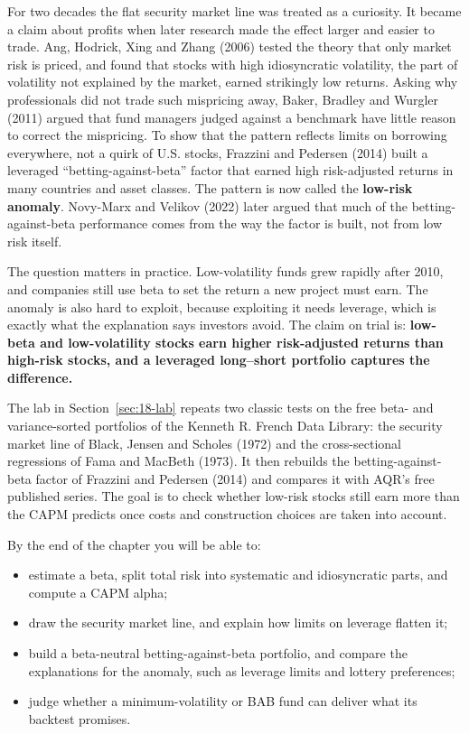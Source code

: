 For two decades the flat security market line was treated as a curiosity. It became a claim about profits when later research made the effect larger and easier to trade. Ang, Hodrick, Xing and Zhang (2006) tested the theory that only market risk is priced, and found that stocks with high idiosyncratic volatility, the part of volatility not explained by the market, earned strikingly low returns. Asking why professionals did not trade such mispricing away, Baker, Bradley and Wurgler (2011) argued that fund managers judged against a benchmark have little reason to correct the mispricing. To show that the pattern reflects limits on borrowing everywhere, not a quirk of U.S. stocks, Frazzini and Pedersen (2014) built a leveraged ``betting-against-beta'' factor that earned high risk-adjusted returns in many countries and asset classes. The pattern is now called the \textbf{low-risk anomaly}. Novy-Marx and Velikov (2022) later argued that much of the betting-against-beta performance comes from the way the factor is built, not from low risk itself.

The question matters in practice. Low-volatility funds grew rapidly after 2010, and companies still use beta to set the return a new project must earn. The anomaly is also hard to exploit, because exploiting it needs leverage, which is exactly what the explanation says investors avoid. The claim on trial is: \textbf{low-beta and low-volatility stocks earn higher risk-adjusted returns than high-risk stocks, and a leveraged long--short portfolio captures the difference.}

The lab in Section~\ref{sec:18-lab} repeats two classic tests on the free beta- and variance-sorted portfolios of the Kenneth R. French Data Library: the security market line of Black, Jensen and Scholes (1972) and the cross-sectional regressions of Fama and MacBeth (1973). It then rebuilds the betting-against-beta factor of Frazzini and Pedersen (2014) and compares it with AQR's free published series. The goal is to check whether low-risk stocks still earn more than the CAPM predicts once costs and construction choices are taken into account.

By the end of the chapter you will be able to:

\begin{itemize}
  \item estimate a beta, split total risk into systematic and idiosyncratic parts, and compute a CAPM alpha;
  \item draw the security market line, and explain how limits on leverage flatten it;
  \item build a beta-neutral betting-against-beta portfolio, and compare the explanations for the anomaly, such as leverage limits and lottery preferences;
  \item judge whether a minimum-volatility or BAB fund can deliver what its backtest promises.
\end{itemize}


